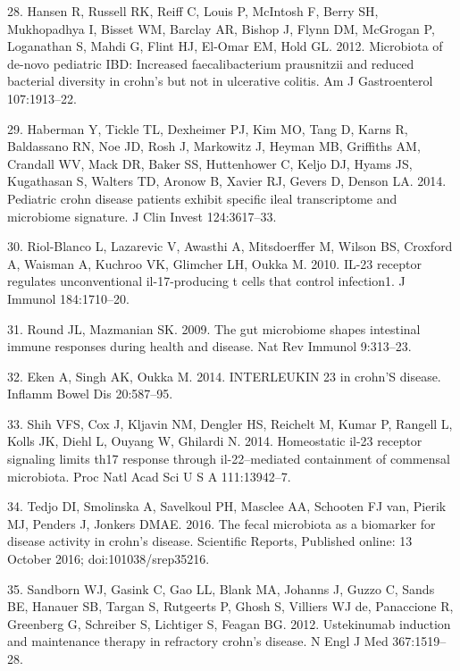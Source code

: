 \documentclass[12pt,]{article}
\begin{document}
\hypertarget{ref-hansen_pedsIBD_2012}{}
28. Hansen R, Russell RK, Reiff C, Louis P, McIntosh F, Berry SH,
Mukhopadhya I, Bisset WM, Barclay AR, Bishop J, Flynn DM, McGrogan P,
Loganathan S, Mahdi G, Flint HJ, El-Omar EM, Hold GL. 2012. Microbiota
of de-novo pediatric IBD: Increased faecalibacterium prausnitzii and
reduced bacterial diversity in crohn's but not in ulcerative colitis. Am
J Gastroenterol 107:1913--22.

\hypertarget{ref-haberman_pedsCD_2014}{}
29. Haberman Y, Tickle TL, Dexheimer PJ, Kim MO, Tang D, Karns R,
Baldassano RN, Noe JD, Rosh J, Markowitz J, Heyman MB, Griffiths AM,
Crandall WV, Mack DR, Baker SS, Huttenhower C, Keljo DJ, Hyams JS,
Kugathasan S, Walters TD, Aronow B, Xavier RJ, Gevers D, Denson LA.
2014. Pediatric crohn disease patients exhibit specific ileal
transcriptome and microbiome signature. J Clin Invest 124:3617--33.

\hypertarget{ref-Riol-Blanco_IL23microbiome_2010}{}
30. Riol-Blanco L, Lazarevic V, Awasthi A, Mitsdoerffer M, Wilson BS,
Croxford A, Waisman A, Kuchroo VK, Glimcher LH, Oukka M. 2010. IL-23
receptor regulates unconventional il-17-producing t cells that control
infection1. J Immunol 184:1710--20.

\hypertarget{ref-Round_IL23microbiome_2009}{}
31. Round JL, Mazmanian SK. 2009. The gut microbiome shapes intestinal
immune responses during health and disease. Nat Rev Immunol 9:313--23.

\hypertarget{ref-Eken_IL23CD_2014}{}
32. Eken A, Singh AK, Oukka M. 2014. INTERLEUKIN 23 in crohn'S disease.
Inflamm Bowel Dis 20:587--95.

\hypertarget{ref-Shih_IL23Th17_2014}{}
33. Shih VFS, Cox J, Kljavin NM, Dengler HS, Reichelt M, Kumar P,
Rangell L, Kolls JK, Diehl L, Ouyang W, Ghilardi N. 2014. Homeostatic
il-23 receptor signaling limits th17 response through il-22--mediated
containment of commensal microbiota. Proc Natl Acad Sci U S A
111:13942--7.

\hypertarget{ref-tedjo_CDactivity_2016}{}
34. Tedjo DI, Smolinska A, Savelkoul PH, Masclee AA, Schooten FJ van,
Pierik MJ, Penders J, Jonkers DMAE. 2016. The fecal microbiota as a
biomarker for disease activity in crohn's disease. Scientific Reports,
Published online: 13 October 2016; doi:101038/srep35216.

\hypertarget{ref-sandborn_ust_2012}{}
35. Sandborn WJ, Gasink C, Gao LL, Blank MA, Johanns J, Guzzo C, Sands
BE, Hanauer SB, Targan S, Rutgeerts P, Ghosh S, Villiers WJ de,
Panaccione R, Greenberg G, Schreiber S, Lichtiger S, Feagan BG. 2012.
Ustekinumab induction and maintenance therapy in refractory crohn's
disease. N Engl J Med 367:1519--28.
\end{document}
